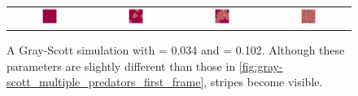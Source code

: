 \begin{figure}[h]
\centering
\mySfFamily
\begin{tabular}{c c c c}
\includegraphics[width = 0.2\textwidth]{../images/f038_k102_multi_Moment_1.jpg} & \includegraphics[width = 0.2\textwidth]{../images/f038_k102_multi_Moment_2.jpg} & \includegraphics[width = 0.2\textwidth]{../images/f038_k102_multi_Moment_3.jpg} & \includegraphics[width = 0.2\textwidth]{../images/f038_k102_multi_Moment_4.jpg}
\end{tabular}
\caption{A Gray-Scott simulation with  = 0.034 and  = 0.102. Although these parameters are slightly different than those in \autoref{fig:gray-scott_multiple_predators_first_frame}, stripes become visible.}
\label{fig:gray-scott_f38_k102_first_frame}
\end{figure}

